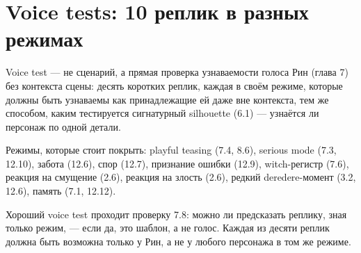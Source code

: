 \section{Voice tests: 10 реплик в разных режимах}

Voice test — не сценарий, а прямая проверка узнаваемости голоса Рин (глава 7) без контекста сцены: десять коротких реплик, каждая в своём режиме, которые должны быть узнаваемы как принадлежащие ей даже вне контекста, тем же способом, каким тестируется сигнатурный silhouette (6.1) — узнаётся ли персонаж по одной детали.

Режимы, которые стоит покрыть: playful teasing (7.4, 8.6), serious mode (7.3, 12.10), забота (12.6), спор (12.7), признание ошибки (12.9), witch-регистр (7.6), реакция на смущение (2.6), реакция на злость (2.6), редкий deredere-момент (3.2, 12.6), память (7.1, 12.12).

Хороший voice test проходит проверку 7.8: можно ли предсказать реплику, зная только режим, — если да, это шаблон, а не голос. Каждая из десяти реплик должна быть возможна только у Рин, а не у любого персонажа в том же режиме.

